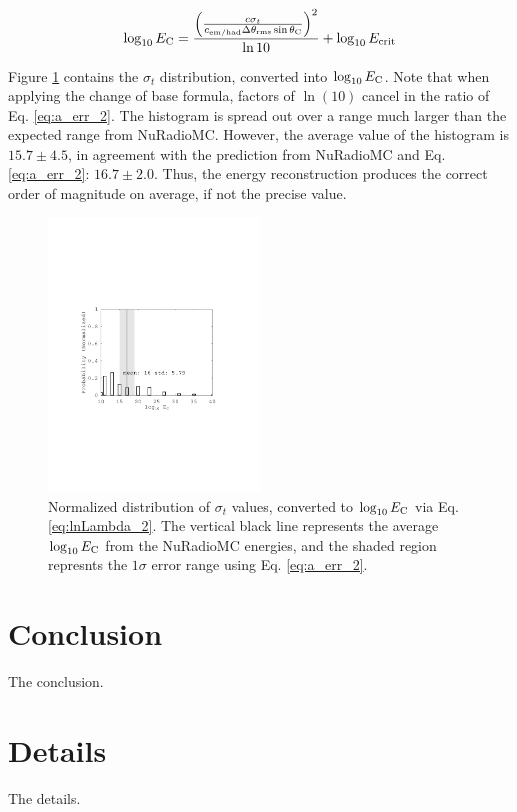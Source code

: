 \documentclass[amsmath,amssymb,aps,prd,10pt,twocolumn,showkeys]{revtex4}
\begin{document}
\begin{itemize}
\begin{equation}
\log_{10} E_{\rm C} = \frac{\left( \frac{c\sigma_t}{c_{\rm em/had} \Delta\theta_{\rm rms}\sin\theta_{\rm C}} \right)^2}{\ln 10} + \log_{10} E_{\rm crit} \label{eq:lnLambda_2}
\end{equation}

Figure \ref{fig:fig6} contains the $\sigma_t$ distribution, converted into $\log_{10} E_{\rm C}$.  Note that when applying the change of base formula, factors of $\ln(10)$ cancel in the ratio of Eq. \ref{eq:a_err_2}.  The histogram is spread out over a range much larger than the expected range from NuRadioMC.  However, the average value of the histogram is $15.7 \pm 4.5$, in agreement with the prediction from NuRadioMC and Eq. \ref{eq:a_err_2}: $16.7 \pm 2.0$.  Thus, the energy reconstruction produces the correct order of magnitude on average, if not the precise value.

\begin{figure}
\centering
\includegraphics[width=0.5\textwidth,trim=3.25cm 8.25cm 4.5cm 8.25cm,clip=true]{Aug19_plot1.pdf}
\caption{\label{fig:fig6} Normalized distribution of $\sigma_t$ values, converted to $\log_{10}E_{\rm C}$ via Eq. \ref{eq:lnLambda_2}.  The vertical black line represents the average $\log_{10}E_{\rm C}$ from the NuRadioMC energies, and the shaded region represnts the $1\sigma$ error range using Eq. \ref{eq:a_err_2}.}
\end{figure}

\end{itemize}

\section{Conclusion}
\label{sec:conc}

The conclusion.

\appendix

\section{Details}
\label{app:a}

The details.


\end{document}

